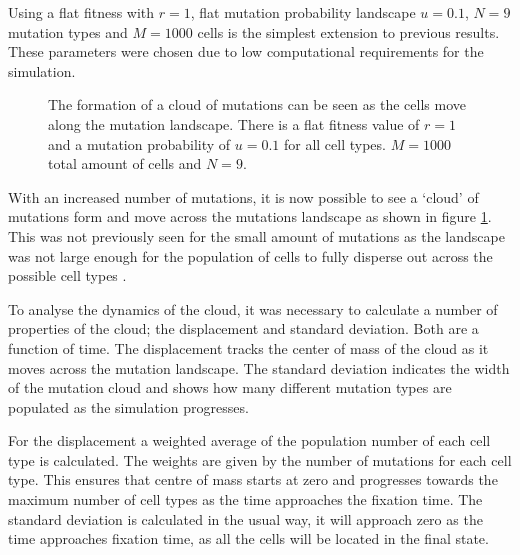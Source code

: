 \documentclass[12pt, a4paper,]{article}
\let\cite=\supercite
\begin{document}
Using a flat fitness with $r=1$, flat mutation probability landscape $u = 0.1$,  $N=9$ mutation types and $M=1000$ cells is the simplest extension to previous results. These parameters were chosen due to low computational requirements for the simulation. 

\begin{figure}[H]
	\begin{subfigure}[h]{0.5\textwidth}
		
	\end{subfigure}%
	\begin{subfigure}[h]{0.5 \textwidth}
		
	\end{subfigure}%
	\vspace{-0.5cm}
	\begin{subfigure}[h]{0.5 \textwidth}
		
	\end{subfigure}
	\begin{subfigure}[h]{0.5 \textwidth}
		
	\end{subfigure}
	\caption{The formation of a cloud of mutations can be seen as the cells move along the mutation landscape. There is a flat fitness value of $r= 1$ and a mutation probability of $u = 0.1$ for all cell types. $M=1000$ total amount of cells and $N=9$.  }
	\label{fig:Cloud}
\end{figure}

With an increased number of mutations, it is now possible to see  a `cloud' of mutations form and move across the mutations landscape as shown in figure \ref{fig:Cloud}. This was not previously seen for the small amount of mutations as the landscape was not large enough for the population of cells to fully disperse out across the possible cell types  \cite{ashcroft_stochastic_2014}\cite{haeno_stochastic_2013}. 

To analyse the dynamics of the cloud, it was necessary to calculate a number of properties of the cloud; the displacement and standard deviation. Both are a function of time. The displacement tracks the center of mass of the cloud as it moves across the mutation landscape. The standard deviation indicates the width of the mutation cloud and shows how many different mutation types are populated as the simulation progresses. 

For the displacement a weighted average of the population number of each cell type is calculated. The weights are given by the number of mutations for each cell type. This ensures that centre of mass starts at zero and progresses towards the maximum number of cell types as the time approaches the fixation time. The standard deviation is calculated in the usual way, it will approach zero as the time approaches fixation time, as all the cells will be located in the final state. 
\end{document}
